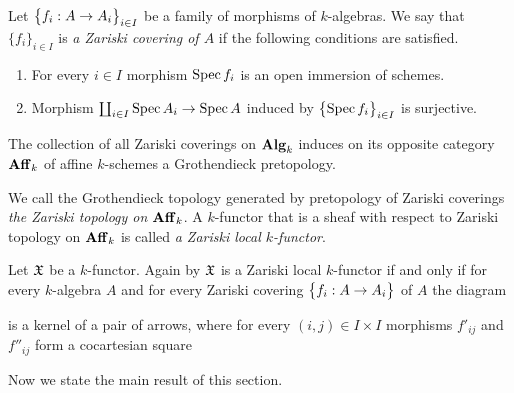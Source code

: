 \begin{definition}
Let $\big\{f_i:A\rightarrow A_i\big\}_{i\in I}$ be a family of morphisms of $k$-algebras. We say that $\{f_i\}_{i\in I}$ is \textit{a Zariski covering of $A$} if the following conditions are satisfied.
\begin{enumerate}[label=\textbf{(\arabic*)}, leftmargin=1.5em]
\item For every $i\in I$ morphism $\mathrm{Spec}\, f_i$ is an open immersion of schemes.
\item Morphism $\coprod_{i\in I}\mathrm{Spec}\, A_i\rightarrow \mathrm{Spec}\, A$ induced by $\big\{\mathrm{Spec}\, f_i\big\}_{i\in I}$ is surjective.
\end{enumerate}
\end{definition}
\noindent
The collection of all Zariski coverings on $\mathbf{Alg}_k$ induces on its opposite category $\mathbf{Aff}_k$ of affine $k$-schemes a Grothendieck pretopology.

\begin{definition}
We call the Grothendieck topology generated by pretopology of Zariski coverings \textit{the Zariski topology on $\mathbf{Aff}_k$}. A $k$-functor that is a sheaf with respect to Zariski topology on $\mathbf{Aff}_k$ is called \textit{a Zariski local $k$-functor}.
\end{definition}
\noindent
Let ${\mathfrak X}$ be a $k$-functor. Again by {\cite[Theorem 3.5]{Sheaves}} ${\mathfrak X}$ is a Zariski local $k$-functor if and only if for every $k$-algebra $A$ and for every Zariski covering $\big\{f_i:A\rightarrow A_i\big\}$ of $A$ the diagram
\begin{center}
\end{center}
is a kernel of a pair of arrows, where for every $(i,j)\in I\times I$ morphisms $f'_{ij}$ and $f''_{ij}$ form a cocartesian square
\begin{center}
\end{center}
\noindent
Now we state the main result of this section.

